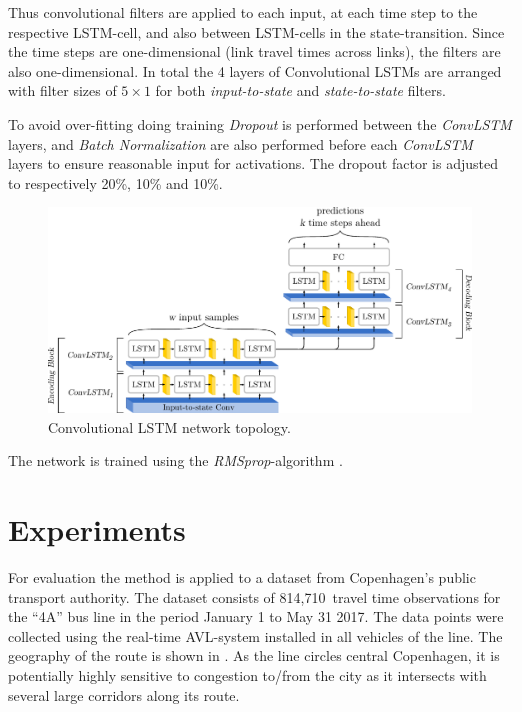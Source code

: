 \documentclass[preprint,12pt]{elsarticle}
\begin{document}
Thus convolutional filters are applied to each input, at each time step to the respective LSTM-cell, and also between LSTM-cells in the state-transition. Since the time steps are one-dimensional (link travel times across links), the filters are also one-dimensional. In total the 4 layers of Convolutional LSTMs are arranged with filter sizes of $5\times1$ for both \emph{input-to-state} and \emph{state-to-state} filters.

To avoid over-fitting doing training \emph{Dropout} \cite{Dropout} is performed between the \emph{ConvLSTM} layers, and \emph{Batch Normalization} \cite{BatchNorm} are also performed before each \emph{ConvLSTM} layers to ensure reasonable input for activations. The dropout factor is adjusted to respectively 20\%, 10\% and 10\%.

\begin{figure}[!ht]
  \centering
  \includegraphics[scale=.8]{drawings/conv_lstm.pdf}
  \caption{Convolutional LSTM network topology.}
  \label{fig:ConvLSTM}
\end{figure}

The network is trained using the \emph{RMSprop}-algorithm \cite{RMSprop}.

\section{Experiments}
\label{sec:experiments}
For evaluation the method is applied to a dataset from Copenhagen's public transport authority. The dataset consists of 814,710~travel time observations for the ``4A'' bus line in the period January 1 to May 31 2017. The data points were  collected using the real-time AVL-system installed in all vehicles of the line. The geography of the route is shown in . As the line circles central Copenhagen, it is potentially highly sensitive to congestion to/from the city as it intersects with several large corridors along its route.
\end{document}
